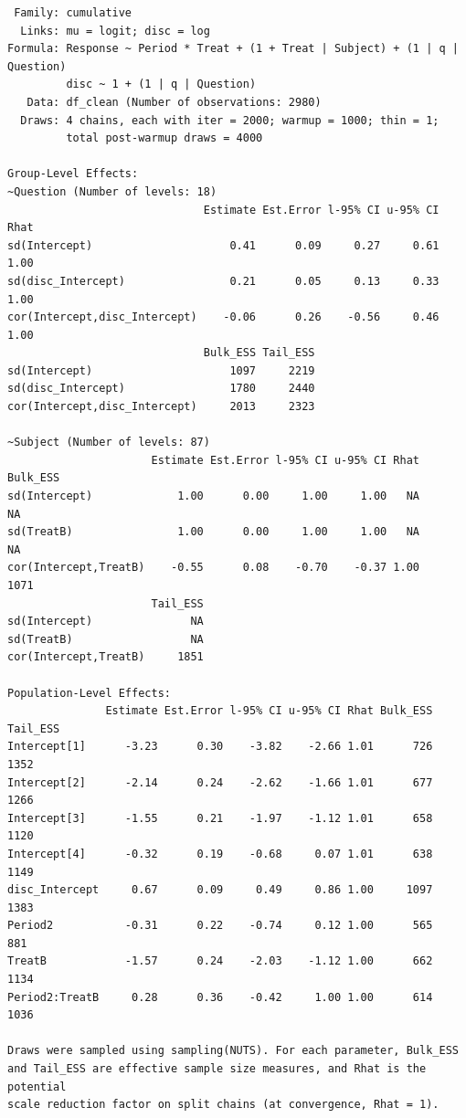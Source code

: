 \documentclass[
  12pt,
  a4paper,
  extrafontsizes,
  onecolumn,
  openright]{memoir}
\begin{document}
\begin{verbatim}
 Family: cumulative 
  Links: mu = logit; disc = log 
Formula: Response ~ Period * Treat + (1 + Treat | Subject) + (1 | q | Question) 
         disc ~ 1 + (1 | q | Question)
   Data: df_clean (Number of observations: 2980) 
  Draws: 4 chains, each with iter = 2000; warmup = 1000; thin = 1;
         total post-warmup draws = 4000

Group-Level Effects: 
~Question (Number of levels: 18) 
                              Estimate Est.Error l-95% CI u-95% CI Rhat
sd(Intercept)                     0.41      0.09     0.27     0.61 1.00
sd(disc_Intercept)                0.21      0.05     0.13     0.33 1.00
cor(Intercept,disc_Intercept)    -0.06      0.26    -0.56     0.46 1.00
                              Bulk_ESS Tail_ESS
sd(Intercept)                     1097     2219
sd(disc_Intercept)                1780     2440
cor(Intercept,disc_Intercept)     2013     2323

~Subject (Number of levels: 87) 
                      Estimate Est.Error l-95% CI u-95% CI Rhat Bulk_ESS
sd(Intercept)             1.00      0.00     1.00     1.00   NA       NA
sd(TreatB)                1.00      0.00     1.00     1.00   NA       NA
cor(Intercept,TreatB)    -0.55      0.08    -0.70    -0.37 1.00     1071
                      Tail_ESS
sd(Intercept)               NA
sd(TreatB)                  NA
cor(Intercept,TreatB)     1851

Population-Level Effects: 
               Estimate Est.Error l-95% CI u-95% CI Rhat Bulk_ESS Tail_ESS
Intercept[1]      -3.23      0.30    -3.82    -2.66 1.01      726     1352
Intercept[2]      -2.14      0.24    -2.62    -1.66 1.01      677     1266
Intercept[3]      -1.55      0.21    -1.97    -1.12 1.01      658     1120
Intercept[4]      -0.32      0.19    -0.68     0.07 1.01      638     1149
disc_Intercept     0.67      0.09     0.49     0.86 1.00     1097     1383
Period2           -0.31      0.22    -0.74     0.12 1.00      565      881
TreatB            -1.57      0.24    -2.03    -1.12 1.00      662     1134
Period2:TreatB     0.28      0.36    -0.42     1.00 1.00      614     1036

Draws were sampled using sampling(NUTS). For each parameter, Bulk_ESS
and Tail_ESS are effective sample size measures, and Rhat is the potential
scale reduction factor on split chains (at convergence, Rhat = 1).
\end{verbatim}
\end{document}
